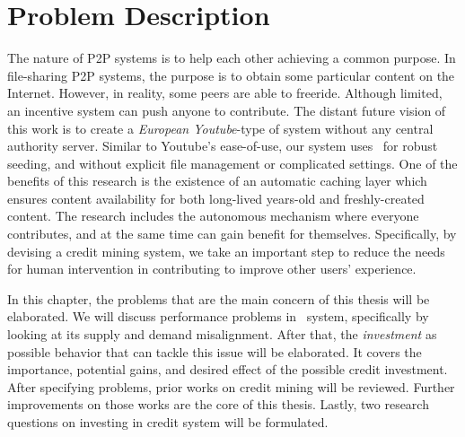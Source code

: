 \chapter{Problem Description}
\label{chp:relwork}
The nature of P2P systems is to help each other achieving a common purpose. In file-sharing P2P systems, the purpose is to obtain some particular content on the Internet. However, in reality, some peers are able to freeride. Although limited, an incentive system can push anyone to contribute. The distant future vision of this work is to create a \textit{European Youtube}-type of system without any central authority server. Similar to Youtube's ease-of-use, our system uses \bt~for robust seeding, and without explicit file management or complicated settings. One of the benefits of this research is the existence of an automatic caching layer which ensures content availability for both long-lived years-old and freshly-created content. The research includes the autonomous mechanism where everyone contributes, and at the same time can gain benefit for themselves. Specifically, by devising a credit mining system, we take an important step to reduce the needs for human intervention in contributing to improve other users' experience.

In this chapter, the problems that are the main concern of this thesis will be elaborated. We will discuss performance problems in \bt~system, specifically by looking at its supply and demand misalignment. After that, the \textit{investment} as possible behavior that can tackle this issue will be elaborated. It covers the importance, potential gains, and desired effect of the possible credit investment. After specifying problems, prior works on credit mining will be reviewed. Further improvements on those works are the core of this thesis. Lastly, two research questions on investing in credit system will be formulated.
 


